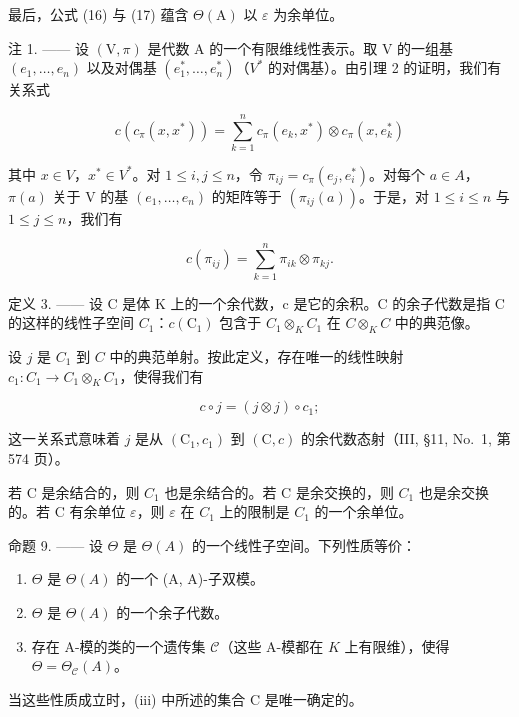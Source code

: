 最后，公式 (16) 与 (17) 蕴含 \(\Theta(\mathrm{A})\) 以 \(\varepsilon\) 为余单位。

注 1. —— 设 \((\mathrm{V},\pi)\) 是代数 A 的一个有限维线性表示。取 V 的一组基 \((e_{1},\ldots,e_{n})\) 以及对偶基 \((e_{1}^{*},\ldots,e_{n}^{*})\)（\(V^{*}\) 的对偶基）。由引理 2 的证明，我们有关系式

\[
c (c _ {\pi} (x, x ^ {*})) = \sum_ {k = 1} ^ {n} c _ {\pi} (e _ {k}, x ^ {*}) \otimes c _ {\pi} (x, e _ {k} ^ {*})\tag{19}
\]

其中 \(x \in V\)，\(x^{*} \in V^{*}\)。对 \(1 \leqslant i, j \leqslant n\)，令 \(\pi_{ij} = c_{\pi}(e_j, e_i^*)\)。对每个 \(a \in A\)，\(\pi(a)\) 关于 V 的基 \((e_1, \ldots, e_n)\) 的矩阵等于 \((\pi_{ij}(a))\)。于是，对 \(1 \leqslant i \leqslant n\) 与 \(1 \leqslant j \leqslant n\)，我们有

\[
c (\pi_ {i j}) = \sum_ {k = 1} ^ {n} \pi_ {i k} \otimes \pi_ {k j}.\tag{20}
\]

定义 3. —— 设 C 是体 K 上的一个余代数，c 是它的余积。C 的余子代数是指 C 的这样的线性子空间 \(C_{1}\)：\(c(\mathrm{C}_{1})\) 包含于 \(C_{1} \otimes_{K} C_{1}\) 在 \(C \otimes_{K} C\) 中的典范像。

设 \(j\) 是 \(C_1\) 到 \(C\) 中的典范单射。按此定义，存在唯一的线性映射 \(c_1: C_1 \to C_1 \otimes_K C_1\)，使得我们有

\[
c \circ j = (j \otimes j) \circ c _ {1};\tag{21}
\]

这一关系式意味着 \(j\) 是从 \((\mathrm{C}_1, c_1)\) 到 \((\mathrm{C}, c)\) 的余代数态射（III, §11, No.~1, 第 574 页）。

若 C 是余结合的，则 \(C_{1}\) 也是余结合的。若 C 是余交换的，则 \(C_{1}\) 也是余交换的。若 C 有余单位 \(\varepsilon\)，则 \(\varepsilon\) 在 \(C_{1}\) 上的限制是 \(C_{1}\) 的一个余单位。

命题 9. —— 设 \(\Theta\) 是 \(\Theta(A)\) 的一个线性子空间。下列性质等价：

\begin{enumerate}
\def\labelenumi{(\roman{enumi})}
\item
  \(\Theta\) 是 \(\Theta(A)\) 的一个 (A, A)-子双模。
\item
  \(\Theta\) 是 \(\Theta(A)\) 的一个余子代数。
\item
  存在 A-模的类的一个遗传集 \(\mathcal{C}\)（这些 A-模都在 \(K\) 上有限维），使得 \(\Theta = \Theta_{\mathcal{C}}(A)\)。
\end{enumerate}

当这些性质成立时，(iii) 中所述的集合 C 是唯一确定的。

